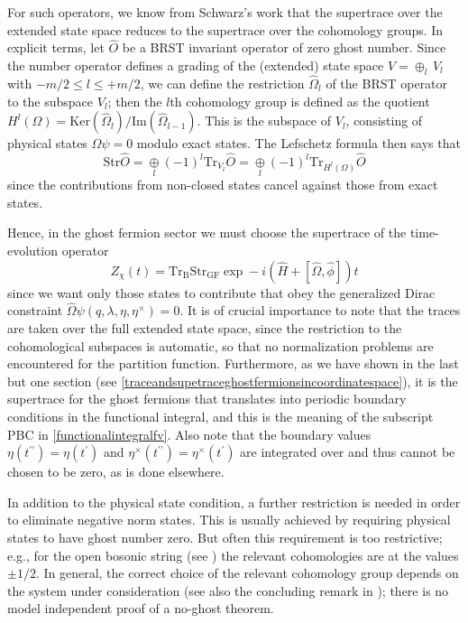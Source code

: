 \documentclass[a4paper,10pt]{article}
\begin{document}
For such operators, we know from Schwarz's work \cite{Schw 89} that the supertrace over 
the extended state space reduces to the supertrace over the cohomology groups. In explicit 
terms, let $\hat{O}$ be a BRST invariant operator of zero ghost number. Since the number 
operator defines a grading of the (extended) state space $V=\oplus_l\,V_l$ with $-m/2\leq 
l\leq+m/2$, we can define the restriction $\hat{\Omega}_l$ of the BRST operator to the 
subspace $V_l$; then the $l$th cohomology group is defined as the quotient 
$H^l(\Omega)=\mathrm{Ker}(\hat{\Omega}_l)/\mathrm{Im}(\hat{\Omega}_{l-1})$. This is the 
subspace of $V_l$, consisting of physical states $\Omega \psi=0$ modulo exact states. The 
Lefschetz formula \cite{Schw 89} then says that
\begin{equation}
\mathrm{Str}\hat{O}=\underset{l}{\oplus}(-
1)^l\mathrm{Tr}_{V_l}\hat{O}=\underset{l}{\oplus}(-1)^l\mathrm{Tr}_{H^l(\Omega)}\hat{O}
\end{equation}
since the contributions from non-closed states cancel against those from exact 
states.

Hence, in the ghost fermion sector we must choose the supertrace of the time-evolution 
operator
\begin{equation}
Z_{\chi}(t)=\mathrm{Tr}_{\mathrm{B}}\mathrm{Str}_{\mathrm{GF}}\exp -
i(\hat{H}+[\hat{\Omega},\hat{\phi}])t
\end{equation}
since we want only those states to contribute that obey the generalized Dirac constraint 
$\hat{\Omega}\psi(q,\lambda,\eta,\eta^{\times})=0$. It is of crucial importance to note 
that the traces are taken over the full extended state space, since the restriction to 
the cohomological subspaces is automatic, so that no normalization problems are 
encountered for the partition function. Furthermore, as we have shown in the last but one 
section (see \eqref{traceandsupetraceghostfermionsincoordinatespace}), it is the 
supertrace for the ghost fermions that translates into periodic boundary conditions in 
the functional integral, and this is the meaning of the subscript PBC in 
\eqref{functionalintegralfv}. Also note that the boundary values 
$\eta(t^{\prime\prime})=\eta(t^{\prime})$ and 
$\eta^{\times}(t^{\prime\prime})=\eta^{\times}(t^{\prime})$ are integrated over and thus 
cannot be chosen to be zero, as is done elsewhere.

In addition to the physical state condition, a further restriction is needed in order to 
eliminate negative norm states. This is usually achieved by requiring physical states to 
have ghost number zero. But often this requirement is too restrictive; e.g., for the open 
bosonic string (see \cite{Gree 88}) the relevant cohomologies are at the values $\pm1/2$. 
In general, the correct choice of the relevant cohomology group depends on the system 
under consideration (see also the concluding remark in \cite{Kala 91}); there is no model 
independent proof of a no-ghost theorem.
\end{document}

